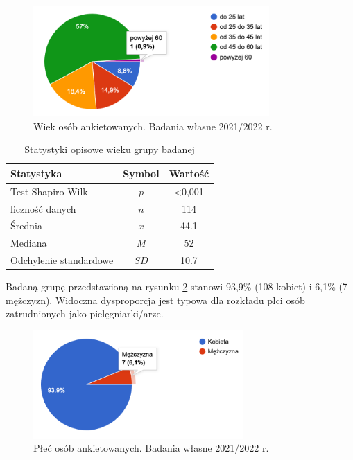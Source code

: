 \documentclass[a4paper,12pt,twoside,openright]{mwrep}
\begin{document}
\begin{figure}[H]
\centering
\includegraphics[width=9cm]{char_gr_bad/wiek00}
\caption{Wiek osób ankietowanych. Badania własne 2021/2022 r.}
\label{rys:wiek}
\end{figure}


\begin {table}[H]
\caption{Statystyki opisowe wieku grupy badanej}
\centering
\begin{tabular}{|l|c|c|}
\hline
Statystyka & Symbol & Wartość\\
\hline
Test Shapiro-Wilk & $p$ & <0,001\\
\hline
liczność danych & $n$ & 114\\
\hline
Średnia & $\bar{x}$ & 44.1\\
\hline
Mediana & $M$ & 52\\
\hline
Odchylenie standardowe & $SD$ & 10.7\\
\hline

\end{tabular}
\label{tab:wiek}
\end{table}



Badaną grupę przedstawioną  na rysunku \ref{rys:plec} stanowi  93,9\%  (108 kobiet) i  6,1\%  (7 mężczyzn). Widoczna dysproporcja jest typowa dla rozkładu płci osób zatrudnionych jako pielęgniarki/arze.

\begin{figure}[H]
\centering
\includegraphics[width=8cm]{char_gr_bad/plec00}
\caption{Płeć osób ankietowanych. Badania własne 2021/2022 r.}
\label{rys:plec}
\end{figure}
\end{document}
